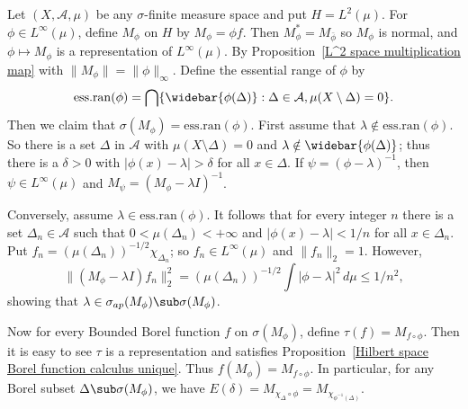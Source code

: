 \begin{example}\label{spectral measure for multiplication operator}
Let $(X,\mathcal{A},\mu)$ be any $\sigma$-finite measure space and put $H=L^2(\mu)$. For $\phi\in L^\infty(\mu)$, define $M_\phi$ on $H$ by $M_\phi=\phi f$. Then $M_\phi^*=M_{\bar{\phi}}$ so $M_\phi$ is normal, and $\phi\mapsto M_\phi$ is a representation of $L^\infty(\mu)$. By Proposition~\ref{L^2 space multiplication map} with $\|M_\phi\|=\|\phi\|_\infty$. Define the essential range of $\phi$ by
\[\mathrm{ess.ran}(\phi)=\bigcap\{\widebar{\phi(\Delta)}:\Delta\in\mathcal{A},\mu(X\setminus\Delta)=0\}.\]
Then we claim that $\sigma(M_\phi)=\mathrm{ess.ran}(\phi)$. First assume that $\lambda\notin\mathrm{ess.ran}(\phi)$. So there is a set $\Delta$ in $\mathcal{A}$ with $\mu(X\setminus\Delta)=0$ and $\lambda\notin\widebar{\phi(\Delta)}$; thus there is a $\delta>0$ with $|\phi(x)-\lambda|>\delta$ for all $x\in\Delta$. If $\psi=(\phi-\lambda)^{-1}$, then $\psi\in L^\infty(\mu)$ and $M_\psi=(M_\phi-\lambda I)^{-1}$.\par
Conversely, assume $\lambda\in\mathrm{ess.ran}(\phi) $. It follows that for every integer $n$ there is a set $\Delta_n\in\mathcal{A}$ such that $0<\mu(\Delta_n)<+\infty$ and $|\phi(x)-\lambda|<1/n$ for all $x\in\Delta_n$. Put $f_n=(\mu(\Delta_n))^{-1/2}\chi_{\Delta_n}$; so $f_n\in L^\infty(\mu)$ and $\|f_n\|_2=1$. However,
\[\|(M_\phi-\lambda I)f_n\|_2^2=(\mu(\Delta_n))^{-1/2}\int|\phi-\lambda|^2\,d\mu\leq 1/n^2,\]
showing that $\lambda\in\sigma_{ap}(M_\phi)\sub\sigma(M_\phi)$.\par
Now for every Bounded Borel function $f$ on $\sigma(M_\phi)$, define $\tau(f)=M_{f\circ\phi}$. Then it is easy to see $\tau$ is a representation and satisfies Proposition~\ref{Hilbert space Borel function calculus unique}. Thus $f(M_\phi)=M_{f\circ\phi}$. In particular, for any Borel subset $\Delta\sub\sigma(M_\phi)$, we have $E(\delta)=M_{\chi_\Delta\circ\phi}=M_{\chi_{\phi^{-1}(\Delta)}}$.
\end{example}
